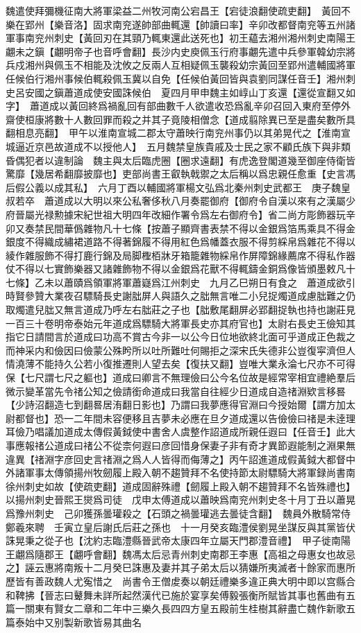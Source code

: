 魏遣使拜彌機征南大將軍梁益二州牧河南公宕昌王【宕徒浪翻使疏吏翻】　黃回不樂在郢州【樂音洛】固求南兖遂帥部曲輒還【帥讀曰率】辛卯改都督南兖等五州諸軍事南兖州刺史【黃回刃在其頸乃輒東還此送死也】初王藴去湘州湘州刺史南陽王翽未之鎭【翽明帝子也音呼會翻】長沙内史庾佩玉行府事翽先遣中兵參軍韓幼宗將兵戍湘州與佩玉不相能及沈攸之反兩人互相疑佩玉襲殺幼宗黃回至郢州遣輔國將軍任候伯行湘州事候伯輒殺佩玉冀以自免【任候伯黃回皆與袁劉同謀任音壬】湘州刺史呂安國之鎭蕭道成使安國誅候伯　夏四月甲申魏主如崞山丁亥還【還從宣翻又如字】　蕭道成以黃回終爲禍亂回有部曲數千人欲遣收恐爲亂辛卯召回入東府至停外齋使桓康將數十人數回罪而殺之并其子竟陵相僧念【道成翦除異已至是盡矣數所具翻相息亮翻】　甲午以淮南宣城二郡太守蕭映行南兖州事仍以其弟晃代之【淮南宣城逼近京邑故道成不以授他人】　五月魏禁皇族貴戚及士民之家不顧氏族下與非類昏偶犯者以違制論　魏主與太后臨虎圈【圈求遠翻】有虎逸登閣道幾至御座侍衛皆驚靡【幾居希翻靡披靡也】吏部尚書王叡執戟禦之太后稱以爲忠親任愈重【史言馮后假公義以成其私】　六月丁酉以輔國將軍楊文弘爲北秦州刺史武都王　庚子魏皇叔若卒　蕭道成以大明以來公私奢侈秋八月奏罷御府【御府令自漢以來有之漢屬少府晉屬光禄勲據宋紀世祖大明四年改細作署令爲左右御府令】省二尚方彫飾器玩辛卯又奏禁民間華僞雜物凡十七條【按蕭子顯齊書表禁不得以金銀爲箔馬乘具不得金銀度不得織成繡裙道路不得著錦履不得用紅色爲幡蓋衣服不得剪綵帛爲雜花不得以綾作雜服飾不得打鹿行錦及局脚檉栢牀牙箱籠雜物綵帛作屏障錦緣薦席不得私作器仗不得以七實飾樂器又諸雜飾物不得以金銀爲花獸不得輒鑄金銅爲像皆頒墨敕凡十七條】乙未以蕭賾爲領軍將軍蕭嶷爲江州刺史　九月乙巳朔日有食之　蕭道成欲引時賢參贊大業夜召驃騎長史謝朏屏人與語久之朏無言唯二小兒捉燭道成慮朏難之仍取燭遣兒朏又無言道成乃呼左右朏莊之子也【朏敷尾翻屏必郢翻捉執也持也謝莊見一百三十卷明帝泰始元年道成爲驃騎大將軍長史亦其府官也】太尉右長史王儉知其指它日請間言於道成曰功高不賞古今非一以公今日位地欲終北面可乎道成正色裁之而神采内和儉因曰儉蒙公殊盻所以吐所難吐何賜拒之深宋氏失德非公豈復寜濟但人情澆薄不能持久公若小復推遷則人望去矣【復扶又翻】豈唯大業永淪七尺亦不可得保【七尺謂七尺之軀也】道成曰卿言不無理儉曰公今名位故是經常宰相宜禮絶羣后微示變革當先令禇公知之儉請銜命道成曰我當自往經少日道成自造禇淵欵言移晷【少詩沼翻造七到翻晷居洧翻日影也】乃謂曰我夢應得官淵曰今授始爾【謂方加太尉都督也】恐一二年間未容便移且吉夢未必應在旦夕道成還以告儉儉曰禇是未逹理耳儉乃唱議加道成太傳假黃鉞使中書舍人虞整作詔道成所親任遐曰【任音壬】此大事應報禇公道成曰禇公不從柰何遐曰彦回惜身保妻子非有奇才異節遐能制之淵果無違異【禇淵字彦回史言禇淵之爲人人皆得而侮薄之】丙午詔進道成假黃鉞大都督中外諸軍事太傳領揚州牧劒履上殿入朝不趨贊拜不名使持節太尉驃騎大將軍録尚書南徐州刺史如故【使疏吏翻】道成固辭殊禮【劒履上殿入朝不趨贊拜不名皆殊禮也】　以揚州刺史晉熙王爕爲司徒　戊申太傅道成以蕭映爲南兖州刺史冬十月丁丑以蕭晃爲豫州刺史　己卯獲孫曇瓘殺之【石頭之禍曇瓘逃去曇徒含翻】　魏員外散騎常侍鄭羲來聘　壬寅立皇后謝氏后莊之孫也　十一月癸亥臨澧侯劉晃坐謀反與其黨皆伏誅晃秉之從子也【沈約志臨澧縣晉武帝太康四年立屬天門郡澧音禮】　甲子徙南陽王翽爲隨郡王【翽呼會翻】魏馮太后忌青州刺史南郡王李惠【高祖之母惠女也故忌之】誣云惠將南叛十二月癸巳誅惠及妻并其子弟太后以猜嫌所夷滅者十餘家而惠所歷皆有善政魏人尤寃惜之　尚書令王僧䖍奏以朝廷禮樂多違正典大明中即以宫縣合和鞞拂【晉志曰鼙舞未詳所起然漢代已施於宴享矣傅毅張衡所賦皆其事也舊曲有五篇一關東有賢女二章和二年中三樂久長四四方皇五殿前生桂樹其辭盡亡魏作新歌五篇泰始中又别製新歌皆易其曲名